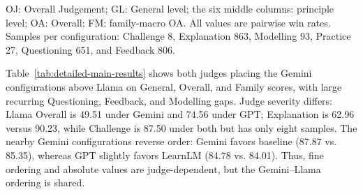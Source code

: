 \documentclass[conference]{IEEEtran}
\begin{document}
\begin{table}[t]
\caption{KMP-compatible pairwise win rates by judge and tutor configuration (\%).}
\label{tab:detailed-main-results}
\centering
\setlength{\tabcolsep}{4.2pt}
\footnotesize OJ: Overall Judgement; GL: General level; the six middle columns: principle level; OA: Overall; FM: family-macro OA. All values are pairwise win rates. Samples per configuration: Challenge 8, Explanation 863, Modelling 93, Practice 27, Questioning 651, and Feedback 806.
\end{table}

Table~\ref{tab:detailed-main-results} shows both judges placing the Gemini
configurations above Llama on General, Overall, and Family scores, with large
recurring Questioning, Feedback, and Modelling gaps. Judge severity differs:
Llama Overall is 49.51 under Gemini and 74.56 under GPT; Explanation is 62.96
versus 90.23, while Challenge is 87.50 under both but has only eight samples.
The nearby Gemini configurations reverse order: Gemini favors baseline (87.87
vs. 85.35), whereas GPT slightly favors LearnLM (84.78 vs. 84.01). Thus, fine
ordering and absolute values are judge-dependent, but the Gemini--Llama
ordering is shared.
\end{document}
